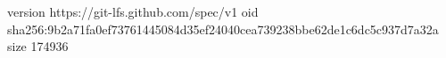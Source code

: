 version https://git-lfs.github.com/spec/v1
oid sha256:9b2a71fa0ef73761445084d35ef24040cea739238bbe62de1c6dc5c937d7a32a
size 174936
